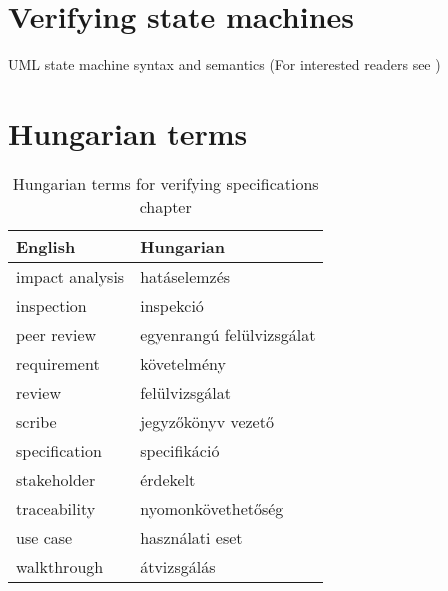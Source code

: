 \section{Verifying state machines}

UML state machine syntax and semantics \cite{omg-uml2} (For interested readers see \cite{pinter-phd})

\section{Hungarian terms}

\begin{table}[ht]
    \centering
    \small
    \caption{Hungarian terms for verifying specifications chapter}
    \begin{tabular}{ll}
        \toprule
        \textbf{English} & \textbf{Hungarian} \\
        \midrule
        impact analysis & hatáselemzés \\
        inspection & inspekció \\
        peer review & egyenrangú felülvizsgálat \\
        requirement & követelmény \\
        review & felülvizsgálat \\
        scribe & jegyzőkönyv vezető \\
        specification & specifikáció \\
        stakeholder & érdekelt \\
        traceability & nyomonkövethetőség \\
        use case & használati eset \\
        walkthrough & átvizsgálás \\
        \bottomrule
        \end{tabular}
        \label{tab:overview:hungarian-terms-specifications}
        \end{table} 
